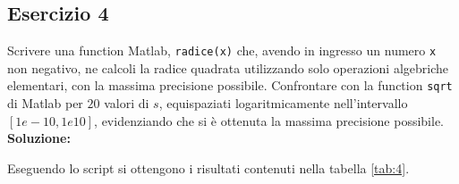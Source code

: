 \subsection{Esercizio 4}
Scrivere una function Matlab, \lstinline{radice(x)} che, avendo in ingresso un numero \lstinline{x}
non negativo, ne calcoli la radice quadrata utilizzando solo operazioni algebriche elementari, con
la massima precisione possibile. Confrontare con la function \lstinline{sqrt} di Matlab per $20$ valori di
$s$, equispaziati logaritmicamente nell'intervallo $[1e-10,1e10]$, evidenziando che si è ottenuta la
massima precisione possibile.
\newline \textbf{Soluzione:}

Eseguendo lo script  si ottengono i risultati contenuti nella
tabella \ref{tab:4}.

